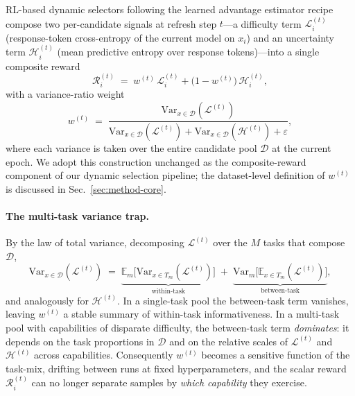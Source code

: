 RL-based dynamic selectors following the learned advantage estimator
recipe~\cite{schulman2017ppo, schulman2016gae} compose two
per-candidate signals at refresh step $t$---a difficulty term
$\mathcal{L}_i^{(t)}$ (response-token cross-entropy of the current
model on $x_i$) and an uncertainty term $\mathcal{H}_i^{(t)}$ (mean
predictive entropy over response tokens)---into a single composite
reward
\begin{equation}
  \mathcal{R}_i^{(t)} \;=\;
  w^{(t)} \, \mathcal{L}_i^{(t)}
  + \bigl(1 - w^{(t)}\bigr)\, \mathcal{H}_i^{(t)},
  \label{eq:composite}
\end{equation}
with a variance-ratio weight
\begin{equation}
  w^{(t)} \;=\;
  \frac{\mathrm{Var}_{x \in \mathcal{D}}(\mathcal{L}^{(t)})}
       {\mathrm{Var}_{x \in \mathcal{D}}(\mathcal{L}^{(t)}) +
        \mathrm{Var}_{x \in \mathcal{D}}(\mathcal{H}^{(t)}) + \varepsilon},
  \label{eq:w}
\end{equation}
where each variance is taken over the entire candidate pool
$\mathcal{D}$ at the current epoch. We adopt this construction
unchanged as the composite-reward component of our dynamic selection
pipeline; the dataset-level definition of $w^{(t)}$ is discussed in
Sec.~\ref{sec:method-core}.

\paragraph{The multi-task variance trap.}
By the law of total variance, decomposing $\mathcal{L}^{(t)}$ over the
$M$ tasks that compose $\mathcal{D}$,
\begin{equation}
  \mathrm{Var}_{x \in \mathcal{D}}(\mathcal{L}^{(t)})
  \;=\;
  \underbrace{\mathbb{E}_{m}\!\bigl[\mathrm{Var}_{x \in T_m}(\mathcal{L}^{(t)})\bigr]}_{\text{within-task}}
  \;+\;
  \underbrace{\mathrm{Var}_{m}\!\bigl[\mathbb{E}_{x \in T_m}(\mathcal{L}^{(t)})\bigr]}_{\text{between-task}},
  \label{eq:total-variance}
\end{equation}
and analogously for $\mathcal{H}^{(t)}$. In a single-task pool the
between-task term vanishes, leaving $w^{(t)}$ a stable summary of
within-task informativeness. In a multi-task pool with capabilities
of disparate difficulty, the between-task term \emph{dominates}:
it depends on the task proportions in $\mathcal{D}$ and on the
relative scales of $\mathcal{L}^{(t)}$ and $\mathcal{H}^{(t)}$ across
capabilities. Consequently $w^{(t)}$ becomes a sensitive function of
the task-mix, drifting between runs at fixed hyperparameters, and the
scalar reward $\mathcal{R}_i^{(t)}$ can no longer separate samples by
\emph{which capability} they exercise.

